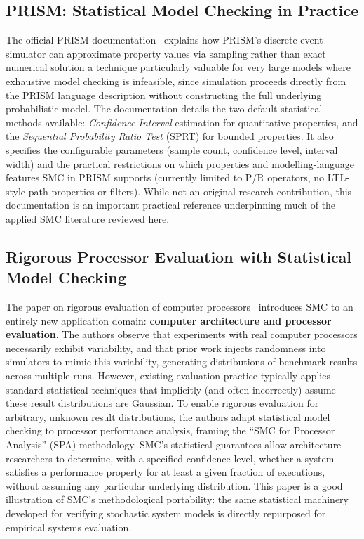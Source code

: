 \subsection{PRISM: Statistical Model Checking in Practice}
\label{sec:lr_prism}

The official PRISM documentation~\cite{prism_smc} explains how PRISM's
discrete-event simulator can approximate property values via sampling
rather than exact numerical solution a technique particularly valuable
for very large models where exhaustive model checking is infeasible,
since simulation proceeds directly from the PRISM language description
without constructing the full underlying probabilistic model.  The
documentation details the two default statistical methods available:
\emph{Confidence Interval} estimation for quantitative properties, and
the \emph{Sequential Probability Ratio Test} (SPRT) for bounded
properties.  It also specifies the configurable parameters (sample count,
confidence level, interval width) and the practical restrictions on which
properties and modelling-language features SMC in PRISM supports
(currently limited to P/R operators, no LTL-style path properties or
filters).  While not an original research contribution, this
documentation is an important practical reference underpinning much of
the applied SMC literature reviewed here.

\subsection{Rigorous Processor Evaluation with Statistical Model Checking}
\label{sec:lr_processors}

The paper on rigorous evaluation of computer
processors~\cite{smc_processors2023} introduces SMC to an entirely new
application domain: \textbf{computer architecture and processor
evaluation}.  The authors observe that experiments with real computer
processors necessarily exhibit variability, and that prior work injects
randomness into simulators to mimic this variability, generating
distributions of benchmark results across multiple runs.  However,
existing evaluation practice typically applies standard statistical
techniques that implicitly (and often incorrectly) assume these result
distributions are Gaussian.  To enable rigorous evaluation for arbitrary,
unknown result distributions, the authors adapt statistical model
checking to processor performance analysis, framing the ``SMC for
Processor Analysis'' (SPA) methodology.  SMC's statistical guarantees
allow architecture researchers to determine, with a specified confidence
level, whether a system satisfies a performance property for at least a
given fraction of executions, without assuming any particular underlying
distribution.  This paper is a good illustration of SMC's methodological
portability: the same statistical machinery developed for verifying
stochastic system models is directly repurposed for empirical systems
evaluation.

